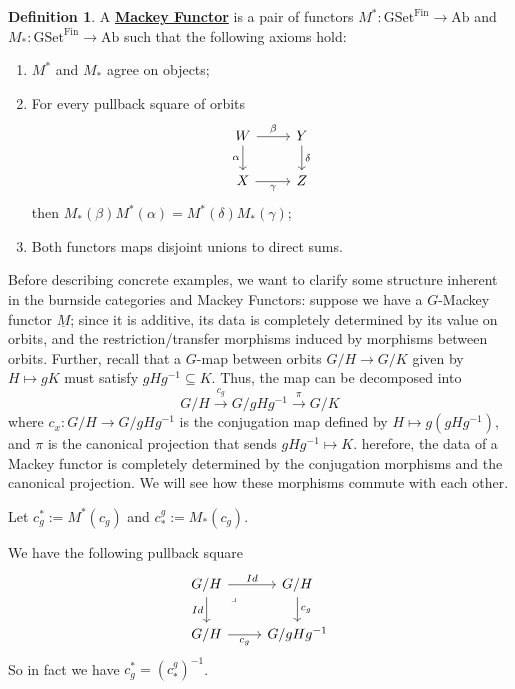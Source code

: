 \documentclass{article}
\theoremstyle{definition}
\newtheorem{definition}[theorem]{Definition}
\begin{document}
\begin{tcolorbox}[colback=purple!5!white,colframe=purple!75!black]
    \begin{definition}
    A \underline{\textbf{Mackey Functor}} is a pair of functors $M^*: \textrm{GSet}^{\textrm{Fin}}\to \textrm{Ab}$ and $M_*: \textrm{GSet}^{\textrm{Fin}}\to \textrm{Ab}$ such that the following axioms hold:
    \begin{enumerate}
        \item $M^*$ and $M_*$ agree on objects;
        \item For every pullback square of orbits
        \[\begin{tikzcd}
            W & Y \\
            X & Z
            \arrow["\beta", from=1-1, to=1-2]
            \arrow["\alpha"', from=1-1, to=2-1]
            \arrow["\delta", from=1-2, to=2-2]
            \arrow["\gamma"', from=2-1, to=2-2]
        \end{tikzcd}\]
        then $M_*(\beta)M^*(\alpha)=M^*(\delta)M_*(\gamma)$;
        \item Both functors maps disjoint unions to direct sums. 
    \end{enumerate}
    \end{definition}
    \end{tcolorbox}
    


Before describing concrete examples, we want to clarify some structure inherent in the burnside categories and Mackey Functors: suppose we have a $G$-Mackey functor $\underline{M}$; since it is additive, its data is completely determined by its value on orbits, and the restriction/transfer morphisms induced by morphisms between orbits. Further, recall that a $G$-map between orbits $G/H\to G/K$ given by $H\mapsto gK$ must satisfy $gHg^{-1}\subseteq K$. Thus, the map can be decomposed into 
\[G/H\xrightarrow{c_{g}} G/gHg^{-1}\xrightarrow{\pi} G/K\] 
where $c_{x}: G/H\to G/gHg^{-1}$ is the conjugation map defined by $H\mapsto g(gHg^{-1})$, and $\pi$ is the canonical projection that sends $gHg^{-1}\mapsto K$. herefore, the data of a Mackey functor is completely determined by the conjugation morphisms and the canonical projection. We will see how these morphisms commute with each other.

Let $c_g^*:=M^*(c_g)$ and $c^g_*:=M_*(c_g)$. 

We have the following pullback square 
\[\begin{tikzcd}
	{G/H} & {G/H} \\
	{G/H} & {G/gHg^{-1}}
	\arrow["Id", from=1-1, to=1-2]
	\arrow["Id"', from=1-1, to=2-1]
	\arrow["\lrcorner"{anchor=center, pos=0.125}, draw=none, from=1-1, to=2-2]
	\arrow["{c_g}", from=1-2, to=2-2]
	\arrow["{c_g}"', from=2-1, to=2-2]
\end{tikzcd}\]
So in fact we have $c_g^*=(c^g_*)^{-1}$. 
\end{document}
